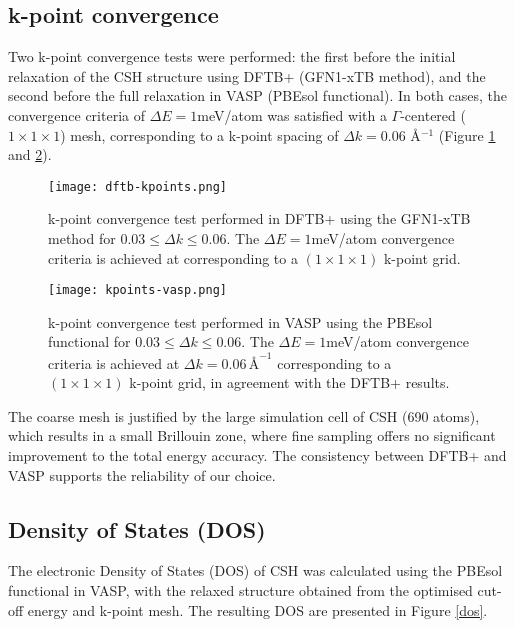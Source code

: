 \subsection{k-point convergence}
 Two k-point convergence tests were performed: the first before the initial relaxation of the CSH structure using DFTB+ (GFN1-xTB method), and the second before the full relaxation in VASP (PBEsol functional). In both cases, the convergence criteria of $\Delta E = 1$meV/atom was satisfied with a $\Gamma$-centered ($1\times 1\times 1$) mesh, corresponding to a k-point spacing of $\Delta k=0.06$ Å$^{-1}$ (Figure \ref{dftb-kpoints} and \ref{kpoints-vasp}). 
\begin{figure}[H]
    \centering
    \texttt{[image: dftb-kpoints.png]}
    \caption{k-point convergence test performed in DFTB+ using the GFN1-xTB method for $0.03 \leq \Delta k \leq 0.06$. The 
    $\Delta E = 1$meV/atom convergence criteria is achieved at  corresponding to a $(1\times 1\times 1)$ k-point grid. 
    }
    \label{dftb-kpoints}
\end{figure}

\begin{figure}[H]
    \centering
    \texttt{[image: kpoints-vasp.png]}
    \caption{k-point convergence test performed in VASP using the PBEsol functional for $0.03 \leq \Delta k \leq 0.06$. The $\Delta E = 1$meV/atom convergence criteria is achieved at $\Delta k = 0.06 \,\text{\AA}^{-1}$ corresponding to a $(1\times 1\times 1)$ k-point grid, in agreement with the DFTB+ results.
    }
    \label{kpoints-vasp}
\end{figure}
The coarse mesh is justified by the large simulation cell of CSH (690 atoms), which results in a small Brillouin zone, where fine sampling offers no significant improvement to the total energy accuracy\supercite{Kresse1996}. The consistency between DFTB+ and VASP supports the reliability of our choice.  
\subsection{Density of States (DOS)}
The electronic Density of States (DOS) of CSH was calculated using the PBEsol functional in VASP, with the relaxed structure obtained from the optimised cut-off energy and k-point mesh. The resulting DOS are presented in Figure \ref{dos}.

